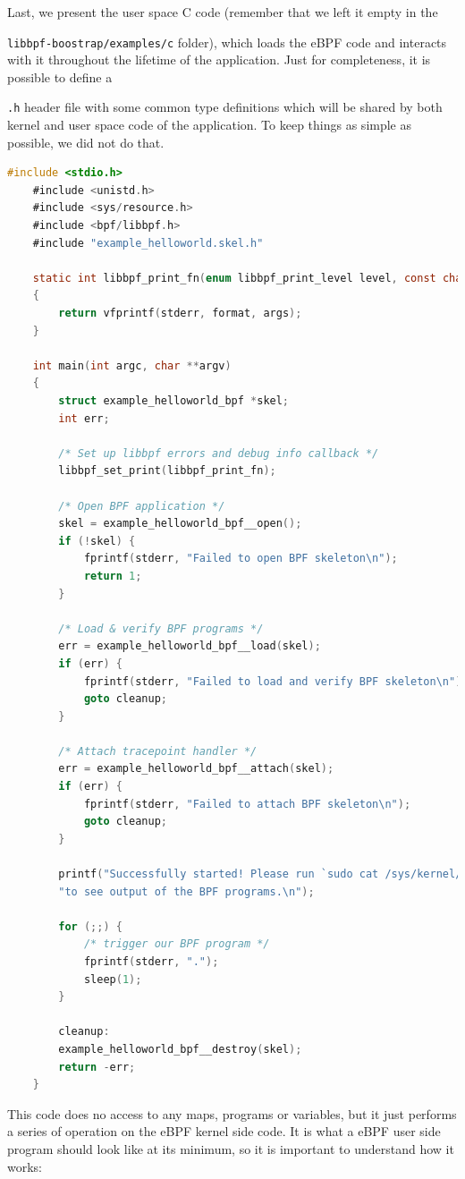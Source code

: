 Last, we present the user space C code (remember that we left it empty in the \raggedright\colorbox{backcolour}{\lstinline[style=commandline, language=bash]|libbpf-boostrap/examples/c|} folder), which loads the eBPF code and interacts with it throughout the lifetime of the application.
Just for completeness, it is possible to define a \raggedright\colorbox{backcolour}{\lstinline[style=commandline, language=bash]|.h|} header file with some common type definitions which will be shared by both kernel and user space code of the application.
To keep things as simple as possible, we did not do that.

\begin{lstlisting}[style=cstyle, language=C, caption={Code of the ``Hello world!''-like user side program in libbpf-bootstrap.}, title=example\_helloworld.c]
	#include <stdio.h>
	#include <unistd.h>
	#include <sys/resource.h>
	#include <bpf/libbpf.h>
	#include "example_helloworld.skel.h"
	
	static int libbpf_print_fn(enum libbpf_print_level level, const char *format, va_list args)
	{
		return vfprintf(stderr, format, args);
	}
	
	int main(int argc, char **argv)
	{
		struct example_helloworld_bpf *skel;
		int err;
		
		/* Set up libbpf errors and debug info callback */
		libbpf_set_print(libbpf_print_fn);
		
		/* Open BPF application */
		skel = example_helloworld_bpf__open();
		if (!skel) {
			fprintf(stderr, "Failed to open BPF skeleton\n");
			return 1;
		}   
		
		/* Load & verify BPF programs */
		err = example_helloworld_bpf__load(skel);
		if (err) {
			fprintf(stderr, "Failed to load and verify BPF skeleton\n");
			goto cleanup;
		}
		
		/* Attach tracepoint handler */
		err = example_helloworld_bpf__attach(skel);
		if (err) {
			fprintf(stderr, "Failed to attach BPF skeleton\n");
			goto cleanup;
		}
		
		printf("Successfully started! Please run `sudo cat /sys/kernel/debug/tracing/trace_pipe` "
		"to see output of the BPF programs.\n");
		
		for (;;) {
			/* trigger our BPF program */
			fprintf(stderr, ".");
			sleep(1);
		}
		
		cleanup:
		example_helloworld_bpf__destroy(skel);
		return -err;
	}
\end{lstlisting}

This code does no access to any maps, programs or variables, but it just performs a series of operation on the eBPF kernel side code.
It is what a eBPF user side program should look like at its minimum, so it is important to understand how it works:

